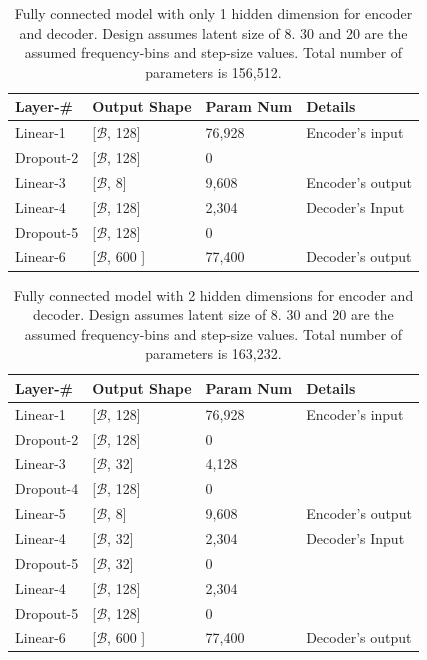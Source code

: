 \documentclass[\main/thesis.tex]{subfiles}
\begin{document}
\begin{table}[]
\begin{tabular}{|p{28mm}|p{25mm}|p{23mm}|p{50mm}|}
\hline
Layer-\# & Output Shape & Param Num & Details  \\ \hline
Linear-1 & [$\mathcal{B}$, 128]  & 76,928 & Encoder's input \\ \hline
Dropout-2 & [$\mathcal{B}$, 128] & 0 &  \\ \hline
Linear-3 & [$\mathcal{B}$, 8] & 9,608 & Encoder's output \\ \hline
Linear-4 & [$\mathcal{B}$, 128] & 2,304 & Decoder's Input \\ \hline
Dropout-5 & [$\mathcal{B}$, 128]  & 0 &  \\ \hline
Linear-6  & [$\mathcal{B}$, 600 ] &  77,400 &Decoder's output\\ \hline
\end{tabular}
\caption{Fully connected model with only 1 hidden dimension for encoder and decoder. Design assumes latent size of 8. 30 and 20 are the assumed frequency-bins and step-size values. Total number of parameters is 156,512.}
\label{table:FC1_AUTOENCODER}
\end{table}

\begin{table}[]

\begin{tabular}{|p{28mm}|p{25mm}|p{23mm}|p{50mm}|}
\hline
Layer-\# & Output Shape & Param Num & Details  \\ \hline
Linear-1 & [$\mathcal{B}$, 128]  & 76,928 & Encoder's input \\ \hline
Dropout-2 & [$\mathcal{B}$, 128] & 0 &  \\ \hline
Linear-3 & [$\mathcal{B}$, 32]  & 4,128 & \\ \hline
Dropout-4 & [$\mathcal{B}$, 128] & 0 &  \\ \hline
Linear-5 & [$\mathcal{B}$, 8] & 9,608 & Encoder's output \\ \hline
Linear-4 & [$\mathcal{B}$, 32] & 2,304 & Decoder's Input \\ \hline
Dropout-5 & [$\mathcal{B}$, 32]  & 0 &  \\ \hline
Linear-4 & [$\mathcal{B}$, 128] & 2,304 & \\ \hline
Dropout-5 & [$\mathcal{B}$, 128]  & 0 &  \\ \hline
Linear-6  & [$\mathcal{B}$, 600 ] &  77,400 &Decoder's output\\ \hline
\end{tabular}
\caption{Fully connected model with 2 hidden dimensions for encoder and decoder. Design assumes latent size of 8. 30 and 20 are the assumed frequency-bins and step-size values. Total number of parameters is 163,232.}
\label{table:FC2_AUTOENCODER}
\end{table}
\end{document}
